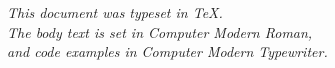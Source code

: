 \documentclass[11pt,twoside]{article}
\begin{document}
\vfill


\begin{center}
\small\itshape
This document was typeset in \TeX.\\
The body text is set in Computer Modern Roman,\\
and code examples in Computer Modern Typewriter.
\end{center}
\end{document}

